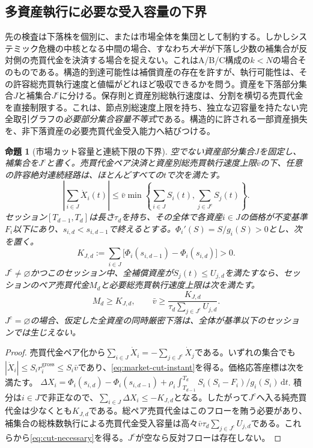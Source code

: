 \documentclass[11pt]{article}
\numberwithin{equation}{section}
\newtheorem{proposition}[theorem]{命題}
\theoremstyle{definition}
\theoremstyle{remark}
\newcommand{\dd}{\,\mathrm{d}}
\begin{document}
\subsection{多資産執行に必要な受入容量の下界}\label{subsec:multiday-cut}
先の検査は下落株を個別に、または市場全体を集団として制約する。しかしシステミック危機の中核となる中間の場合、すなわち\emph{大半}が下落し少数の補集合が反対側の売買代金を決済する場合を捉えない。これはA/B/C構成の$k<N$の場合そのものである。構造的到達可能性は補償資産の存在を許すが、執行可能性は、その許容総売買執行速度と値幅がどれほど吸収できるかを問う。資産を下落部分集合$J$と補集合$J^c$に分ける。保存則と資産別総執行速度は、分割を横切る売買代金を直接制限する。これは、節点別総速度上限を持ち、独立な辺容量を持たない完全取引グラフの\emph{必要部分集合容量不等式}である。構造的に許される一部資産損失を、非下落資産の必要売買代金受入能力へ結びつける。
\begin{proposition}[市場カット容量と連続下限の下界]\label{prop:market-cut}
空でない資産部分集合$J$を固定し、補集合を$J^c$と書く。売買代金ペア決済と資産別総売買執行速度上限$\bar v$の下、任意の許容絶対連続経路は、ほとんどすべての$t$で次を満たす。
\begin{equation}\label{eq:market-cut-instant}
\boxed{\left|\sum_{i\in J}\dot X_i(t)\right|\le
\bar v\min\left\{\sum_{i\in J} S_i(t),\sum_{j\in J^c}S_j(t)\right\}.}
\end{equation}
セッション$[T_{d-1},T_d]$は長さ$\tau_d$を持ち、その全体で各資産$i\in J$の価格が不変基準$F_i$以下にあり、$s_{i,d}<s_{i,d-1}$で終えるとする。$\Phi_i'(S)=S/g_i(S)>0$とし、次を置く。
\begin{equation}\label{eq:cut-required}
K_{J,d}:=\sum_{i\in J}\big[\Phi_i(s_{i,d-1})-\Phi_i(s_{i,d})\big]>0.
\end{equation}
$J^c\ne\varnothing$かつこのセッション中、全補償資産が$S_j(t)\le U_{j,d}$を満たすなら、セッションのペア売買代金$M_d$と必要総売買執行速度上限は次を満たす。
\begin{equation}\label{eq:cut-necessary}
\boxed{M_d\ge K_{J,d},\qquad
\bar v\ge\frac{K_{J,d}}{\tau_d\sum_{j\in J^c}U_{j,d}}.}
\end{equation}
$J^c=\varnothing$の場合、仮定した全資産の同時厳密下落は、全体が基準以下のセッションでは生じえない。
\end{proposition}
\begin{proof}
売買代金ペア化から$\sum_{i\in J}\dot X_i=-\sum_{j\in J^c}\dot X_j$である。いずれの集合でも$|\dot X_i|\le S_i r_i^{\mathrm{gross}}\le S_i\bar v$であり、\eqref{eq:market-cut-instant}を得る。価格応答座標は次を満たす。
$\Delta X_i=\Phi_i(s_{i,d})-\Phi_i(s_{i,d-1})+
\rho_i\int_{T_{d-1}}^{T_d}S_i(S_i-F_i)/g_i(S_i)\dd t$.
積分は$i\in J$で非正なので、$\sum_{i\in J}\Delta X_i\le-K_{J,d}$となる。したがって$J^c$へ入る純売買代金は少なくとも$K_{J,d}$である。総ペア売買代金はこのフローを賄う必要があり、補集合の総株数執行による売買代金受入容量は高々$\bar v\tau_d\sum_{j\in J^c}U_{j,d}$である。これらから\eqref{eq:cut-necessary}を得る。$J^c$が空なら反対フローは存在しない。
\end{proof}
\end{document}
